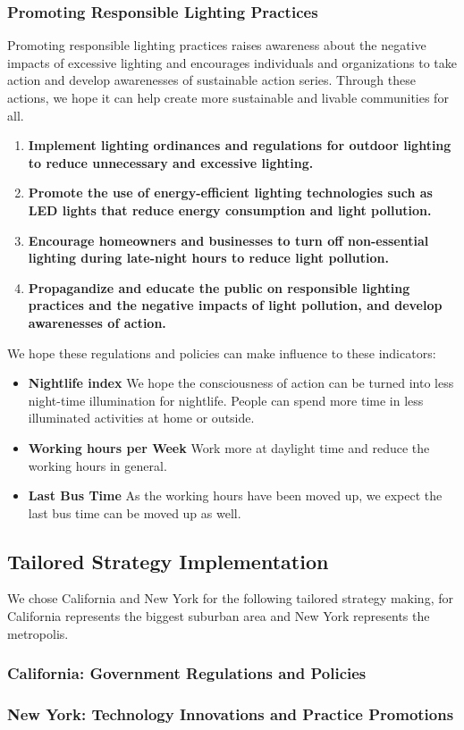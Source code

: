 \subsubsection{Promoting Responsible Lighting Practices}
Promoting responsible lighting practices raises awareness about the negative impacts of excessive lighting and encourages individuals and organizations to take action and develop awarenesses of sustainable action series. Through these actions, we hope it can help create more sustainable and livable communities for all.
\begin{enumerate}
    \item \textbf{Implement lighting ordinances and regulations for outdoor lighting to reduce unnecessary and excessive lighting.}
    
    \item \textbf{Promote the use of energy-efficient lighting technologies such as LED lights that reduce energy consumption and light pollution.}
    
    \item \textbf{Encourage homeowners and businesses to turn off non-essential lighting during late-night hours to reduce light pollution.}
    
    \item \textbf{Propagandize and educate the public on responsible lighting practices and the negative impacts of light pollution, and develop awarenesses of action.}
\end{enumerate}

We hope these regulations and policies can make influence to these indicators:
\begin{itemize}
    \item \textbf{Nightlife index} We hope the consciousness of action can be turned into less night-time illumination for nightlife. People can spend more time in less illuminated activities at home or outside.
    \item \textbf{Working hours per Week} Work more at daylight time and reduce the working hours in general.
    \item \textbf{Last Bus Time} As the working hours have been moved up, we expect the last bus time can be moved up as well.
\end{itemize}





\subsection{Tailored Strategy Implementation}
We chose California and New York for the following tailored strategy making, for California represents the biggest suburban area and New York represents the metropolis. 
\subsubsection{California: Government Regulations and Policies}



\subsubsection{New York: Technology Innovations and Practice Promotions}


